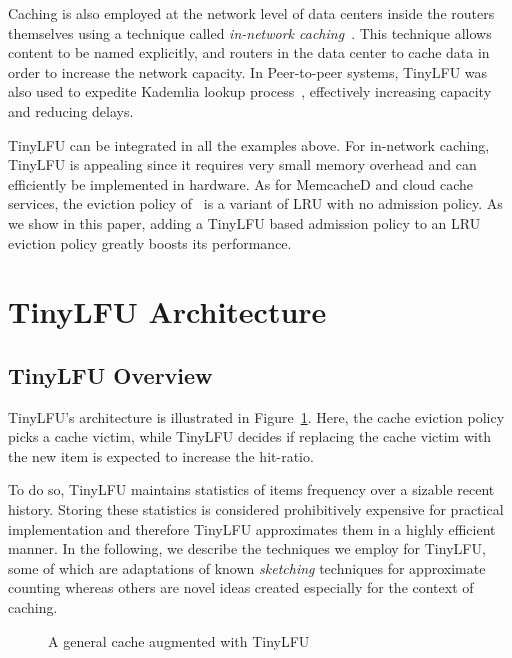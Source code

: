 \documentclass[10pt,a4paper]{article}
\begin{document}
Caching is also employed at the network level of data centers inside the routers themselves
using a technique called \emph{in-network caching}~\cite{NetworkCaching1,NetworkCaching2}. This technique allows content to be named explicitly,
and routers in the data center to cache data in order to increase the network capacity. In Peer-to-peer systems, TinyLFU was also used to expedite Kademlia lookup process~\cite{Shades}, effectively increasing capacity and reducing delays.

TinyLFU can be integrated in all the examples above. For in-network caching, TinyLFU is appealing since it requires very small memory overhead and can efficiently be implemented in hardware.
As for MemcacheD and cloud cache services, the eviction policy of~\cite{MemCacheD,Cloud2} is a variant of LRU with no admission policy.
As we show in this paper, adding a TinyLFU based admission policy to an LRU eviction policy greatly boosts its performance.







\section{TinyLFU Architecture}
\label{sec:tinylfu}

\subsection{TinyLFU Overview}
TinyLFU's architecture is illustrated in Figure~\ref{fig:architecture}.
Here, the cache eviction policy picks a cache victim, while TinyLFU decides if replacing the cache victim with the new item is expected to increase the hit-ratio.

To do so, TinyLFU maintains statistics of items frequency over a sizable recent history. Storing these statistics is considered prohibitively expensive for practical implementation and therefore TinyLFU
approximates them in a highly efficient manner. In the following, we describe the techniques we employ for TinyLFU,
some of which are adaptations of known \emph{sketching} techniques for approximate counting whereas others are novel ideas created especially for the context of caching.









\begin{figure}[t]
\caption{A general cache augmented with TinyLFU}
\label{fig:architecture}
\end{figure}
\end{document}
